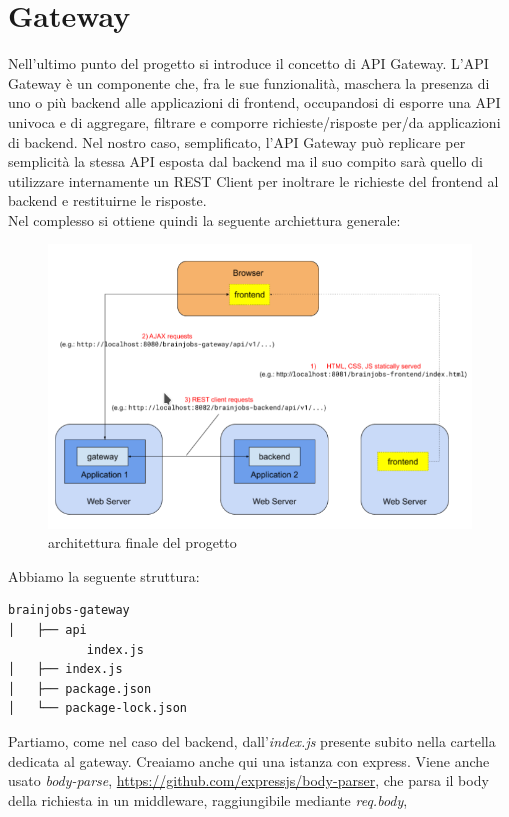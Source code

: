 \documentclass[a4paper,12pt, oneside]{book}
\begin{document}
\chapter{Gateway}
Nell'ultimo punto del progetto si introduce il concetto di API Gateway. L’API Gateway è un componente che, fra le sue funzionalità, maschera la presenza di uno o
più backend alle applicazioni di frontend, occupandosi di esporre una API univoca e di
aggregare, filtrare e comporre richieste/risposte per/da applicazioni di backend.
Nel nostro caso, semplificato, l’API Gateway può replicare per semplicità la stessa API esposta dal
backend ma il suo compito sarà quello di utilizzare internamente un REST Client per
inoltrare le richieste del frontend al backend e restituirne le risposte.\\
Nel complesso si ottiene quindi la seguente archiettura generale:
\begin{figure}[h!]
  \centering
  \includegraphics[scale = 0.68]{img/arch.png}
  \caption{architettura finale del progetto}
\end{figure}
\newpage
Abbiamo la seguente struttura:
\begin{shaded} 
\begin{verbatim}
brainjobs-gateway
│   ├── api
           index.js
│   ├── index.js
│   ├── package.json
│   └── package-lock.json
\end{verbatim}
\end{shaded}
Partiamo, come nel caso del backend, dall'\textit{index.js} presente subito nella cartella
dedicata al gateway. Creaiamo anche qui una istanza con express. Viene anche usato
\textit{body-parse}, \url{https://github.com/expressjs/body-parser}, che parsa il
body della richiesta in un middleware, raggiungibile mediante \textit{req.body},
\end{document}
